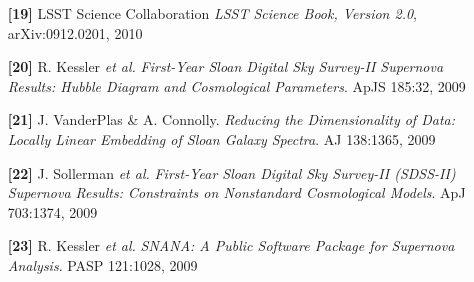 \documentclass{article} %
\def\bf{\bfseries}
\def\sl{\slshape}
\begin{document}
{\begin{itemize}[leftmargin=0ex, itemsep=0ex, parsep=.5ex, labelindent=-4ex]
    \item[{\bf \textcolor{myblue}{[19]}}]
      LSST Science Collaboration
      {\sl LSST Science Book, Version 2.0}, arXiv:0912.0201, 2010

    \item[{\bf \textcolor{myblue}{[20]}}]
      R. Kessler {\it et al.}
      {\it First-Year Sloan Digital Sky Survey-II Supernova Results: 
      Hubble Diagram and Cosmological Parameters}.
      ApJS 185:32, 2009

    \item[{\bf \textcolor{myblue}{[21]}}]
      J. VanderPlas \& A. Connolly.
      {\it Reducing the Dimensionality of Data: Locally 
      Linear Embedding of Sloan Galaxy Spectra}.
      AJ 138:1365, 2009

    \item[{\bf \textcolor{myblue}{[22]}}]
      J. Sollerman {\sl et al.}
      {\it First-Year Sloan Digital Sky Survey-II (SDSS-II) Supernova 
      Results: Constraints on Nonstandard Cosmological Models}.
      ApJ 703:1374, 2009

    \item[{\bf \textcolor{myblue}{[23]}}]
      R. Kessler {\it et al.}
      {\it SNANA: A Public Software Package for Supernova Analysis}.
      PASP 121:1028, 2009

  \end{itemize}
}
\end{document}
